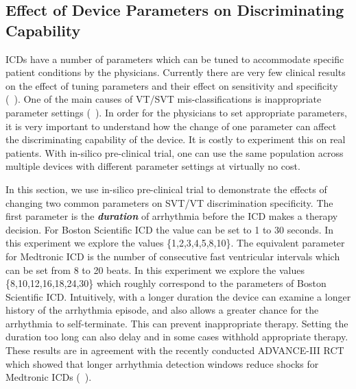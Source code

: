  \subsection{Effect of Device Parameters on Discriminating Capability}
ICDs have a number of parameters which can be tuned to accommodate specific patient conditions by the physicians. 
Currently there are very few clinical results on the effect of tuning parameters and their effect on sensitivity and specificity (~\cite{maditrit}).
One of the main causes of VT/SVT mis-classifications is inappropriate parameter settings (~\cite{wrong_sensing}).
In order for the physicians to set appropriate parameters, it is very important to understand how the change of one parameter can affect the discriminating capability of the device.
It is costly to experiment this on real patients.
With in-silico pre-clinical trial, one can use the same population across multiple devices with different parameter settings at virtually no cost. 

In this section, we use in-silico pre-clinical trial to demonstrate the effects of changing two common parameters on SVT/VT discrimination specificity.
The first parameter is the \emph{\textbf{duration}} of arrhythmia before the ICD makes a therapy decision. 
For Boston Scientific ICD the value can be set to 1 to 30 seconds.
In this experiment we explore the values \{1,2,3,4,5,8,10\}.
The equivalent parameter for Medtronic ICD is the number of consecutive fast ventricular intervals which can be set from 8 to 20 beats.
In this experiment we explore the values \{8,10,12,16,18,24,30\} which roughly correspond to the parameters of Boston Scientific ICD.
Intuitively, with a longer duration the device can examine a longer history of the arrhythmia episode, and also allows a greater chance for the arrhythmia to self-terminate. 
This can prevent inappropriate therapy.
Setting the duration too long can also delay and in some cases withhold appropriate therapy. 
These results are in agreement with the recently conducted ADVANCE-III RCT which showed that longer arrhythmia detection windows reduce shocks for Medtronic ICDs (~\cite{advance3}).

